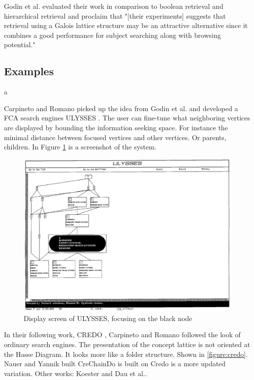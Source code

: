 \documentclass[11pt]{report}
\begin{document}
Godin et al. \cite{Godin1993} evaluated their work in comparison to boolean retrieval and hierarchical retrieval and proclaim that "[their experiments] suggests that retrieval using a Galois lattice structure may be an attractive alternative since it combines a good performance for subject searching along with browsing potential." \\

\subsection{Examples}a

Carpineto and Romano picked up the idea from Godin et al. and developed a FCA search engines ULYSSES \cite{Carpineto1995,Carpineto1996}. The user can fine-tune what neighboring vertices are displayed by bounding the information seeking space. For instance the minimal distance between focused vertices and other vertices. Or parents, children. In Figure \ref{figure:ulysses} is a screenshot of the system. \\

\begin{figure}[h]
	\centering
	\includegraphics[width=\linewidth]{images/ulysses}
\caption{Display screen of ULYSSES, focusing on the black node \cite{Carpineto1996} }
\label{figure:ulysses}
\end{figure}

In their following work, CREDO \cite{Carpineto2004}, Carpineto and Romano followed the look of ordinary search engines. The presentation of the concept lattice is not oriented at the Hasse Diagram. It looks more like a folder structure. Shown in \ref{figure:credo}. Nauer and Yannik built CreChainDo \cite{Nauer2009} is built on Credo is a more updated variation. Other works: Koester \cite{Koester2006} and Dau et al.\cite{Dau2008}.\\
\end{document}
